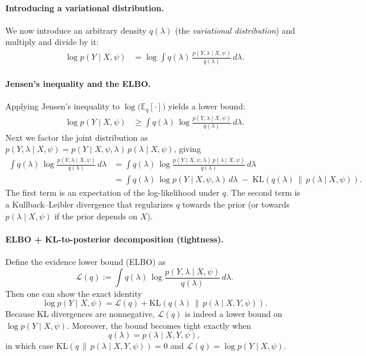 \paragraph{Introducing a variational distribution.}
We now introduce an arbitrary density $q(\lambda)$ (the \emph{variational distribution}) and multiply and divide by it:
\begin{align}
\log p(Y \mid X,\psi)
&= \log \int q(\lambda)\,\frac{p(Y,\lambda \mid X,\psi)}{q(\lambda)}\,d\lambda. \label{eq:insert_q}
\end{align}

\paragraph{Jensen's inequality and the ELBO.}
Applying Jensen's inequality to $\log\big(\mathbb{E}_q[\cdot]\big)$ yields a lower bound:
\begin{align}
\log p(Y \mid X,\psi)
&\ge \int q(\lambda)\,\log\frac{p(Y,\lambda \mid X,\psi)}{q(\lambda)}\,d\lambda. \label{eq:jensen_elbo}
\end{align}
Next we factor the joint distribution as
$p(Y,\lambda\mid X,\psi)=p(Y\mid X,\psi,\lambda)\,p(\lambda\mid X,\psi)$, giving
\begin{align}
\int q(\lambda)\,\log\frac{p(Y,\lambda \mid X,\psi)}{q(\lambda)}\,d\lambda
&= \int q(\lambda)\,\log\frac{p(Y\mid X,\psi,\lambda)\,p(\lambda\mid X,\psi)}{q(\lambda)}\,d\lambda \label{eq:factor_joint}\\
&= \int q(\lambda)\,\log p(Y\mid X,\psi,\lambda)\,d\lambda
\;-\;\mathrm{KL}\!\left(q(\lambda)\,\|\,p(\lambda\mid X,\psi)\right). \label{eq:elbo_kl_prior}
\end{align}
The first term is an expectation of the log-likelihood under $q$.
The second term is a Kullback--Leibler divergence that regularizes $q$ towards the prior
(or towards $p(\lambda\mid X,\psi)$ if the prior depends on $X$).

\paragraph{ELBO + KL-to-posterior decomposition (tightness).}
Define the evidence lower bound (ELBO) as
\begin{equation}\label{eq:elbo_def}
\mathcal{L}(q)
:= \int q(\lambda)\,\log\frac{p(Y,\lambda\mid X,\psi)}{q(\lambda)}\,d\lambda.
\end{equation}
Then one can show the exact identity
\begin{equation}\label{eq:elbo_plus_kl}
\log p(Y\mid X,\psi)
= \mathcal{L}(q) + \mathrm{KL}\!\left(q(\lambda)\,\|\,p(\lambda\mid X,Y,\psi)\right).
\end{equation}
Because KL divergences are nonnegative, $\mathcal{L}(q)$ is indeed a lower bound on $\log p(Y\mid X,\psi)$.
Moreover, the bound becomes tight exactly when
\begin{equation}\label{eq:q_is_posterior}
q(\lambda)=p(\lambda\mid X,Y,\psi),
\end{equation}
in which case $\mathrm{KL}(q\,\|\,p(\lambda\mid X,Y,\psi))=0$ and $\mathcal{L}(q)=\log p(Y\mid X,\psi)$.

